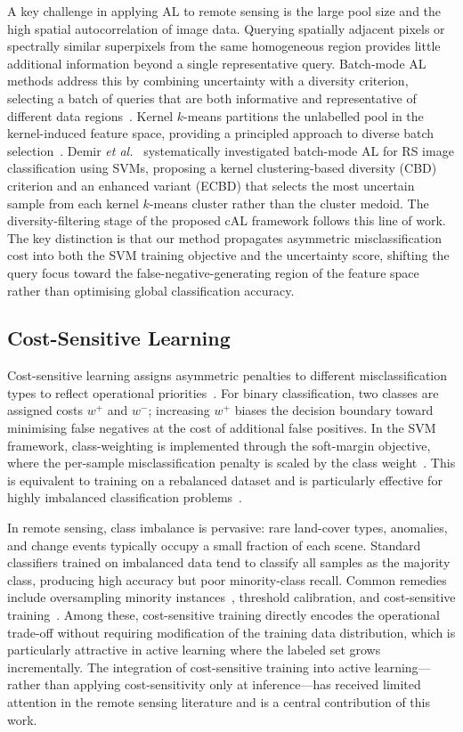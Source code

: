 \documentclass[lettersize,journal]{IEEEtran}
\begin{document}
A key challenge in applying AL to remote sensing is the large pool size
and the high spatial autocorrelation of image data. Querying spatially
adjacent pixels or spectrally similar superpixels from the same homogeneous
region provides little additional information beyond a single representative
query. Batch-mode AL methods address this by combining uncertainty with a
diversity criterion, selecting a batch of queries that are both informative
and representative of different data regions~\cite{ash2020deep}. Kernel
$k$-means partitions the unlabelled pool in the kernel-induced feature
space, providing a principled approach to diverse batch
selection~\cite{tuia2011survey}. Demir \textit{et al.}~\cite{demir2011batch}
systematically investigated batch-mode AL for RS image classification
using SVMs, proposing a kernel clustering-based diversity (CBD) criterion
and an enhanced variant (ECBD) that selects the most uncertain sample from
each kernel $k$-means cluster rather than the cluster medoid. The
diversity-filtering stage of the proposed cAL framework follows this line
of work. The key distinction is that our method propagates asymmetric
misclassification cost into both the SVM training objective and the
uncertainty score, shifting the query focus toward the false-negative-generating
region of the feature space rather than optimising global classification
accuracy.

\subsection{Cost-Sensitive Learning}

Cost-sensitive learning assigns asymmetric penalties to different
misclassification types to reflect operational priorities~\cite{elkan2001foundations}.
For binary classification, two classes are assigned costs $w^{+}$ and $w^{-}$;
increasing $w^{+}$ biases the decision boundary toward minimising false
negatives at the cost of additional false positives. In the SVM framework,
class-weighting is implemented through the soft-margin objective, where
the per-sample misclassification penalty is scaled by the class
weight~\cite{veropoulos1999controlling}. This is equivalent to training on a
rebalanced dataset and is particularly effective for highly imbalanced
classification problems~\cite{he2009imbalanced}.

In remote sensing, class imbalance is pervasive: rare land-cover types,
anomalies, and change events typically occupy a small fraction of each
scene. Standard classifiers trained on imbalanced data tend to classify
all samples as the majority class, producing high accuracy but poor
minority-class recall. Common remedies include oversampling minority
instances~\cite{chawla2002smote}, threshold calibration, and
cost-sensitive training~\cite{sun2007cost}. Among these, cost-sensitive
training directly encodes the operational trade-off without requiring
modification of the training data distribution, which is particularly
attractive in active learning where the labeled set grows incrementally.
The integration of cost-sensitive training into active learning---rather
than applying cost-sensitivity only at inference---has received limited
attention in the remote sensing literature and is a central contribution
of this work.
\end{document}
